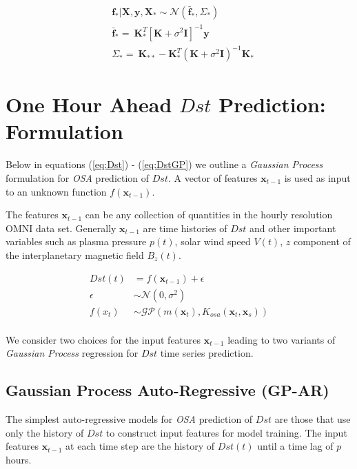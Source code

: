 \documentclass{article}
\begin{document}
\begin{align}
    & \mathbf{f_*}|\mathbf{X},\mathbf{y},\mathbf{X_*} \sim \mathcal{N}(\mathbf{\bar{f}_*}, \Sigma_*)  \label{eq:posterior} \\
    & \mathbf{\bar{f}_*} =  \ \mathbf{K}^T_{*} [\mathbf{K} + \sigma^{2} \mathbf{I}]^{-1} \mathbf{y} \label{eq:posteriormean} \\
    & \Sigma_* = \ \mathbf{K}_{**} - \mathbf{K}^T_{*} \left(\mathbf{K} + \sigma^{2} \mathbf{I}\right)^{-1} \mathbf{K}_{*} \label{eq:posteriorcov}
\end{align}

\section{One Hour Ahead $Dst$ Prediction: Formulation} \label{sec:osa}

Below in equations (\ref{eq:Dst}) - (\ref{eq:DstGP}) we outline a \emph{Gaussian Process} formulation for \emph{OSA} prediction of $Dst$. A vector of features $\mathbf{x}_{t-1}$ is used as input to an unknown function $f(\mathbf{x}_{t-1})$.

The features $\mathbf{x}_{t-1}$ can be any collection of quantities in the hourly resolution OMNI data set. Generally $\mathbf{x}_{t-1}$ are time histories of $Dst$ and other important variables such as plasma pressure $p(t)$, solar wind speed $V(t)$, $z$ component of the interplanetary magnetic field $B_z(t)$.


\begin{align}
    Dst(t) & =  f(\mathbf{x}_{t-1}) + \epsilon \label{eq:Dst} \\
    \epsilon & \sim  \mathcal{N}(0, \sigma^2) \label{eq:GPNoise} \\
    f(x_t) & \sim  \mathcal{GP}(m(\mathbf{x}_t), K_{osa}(\mathbf{x}_t, \mathbf{x}_s)) \label{eq:DstGP} \\
\end{align}

We consider two choices for the input features $\mathbf{x}_{t-1}$ leading to two variants of \emph{Gaussian Process} regression for $Dst$ time series prediction.

\subsection{Gaussian Process Auto-Regressive (GP-AR)} \label{sec:gpar}

The simplest auto-regressive models for \emph{OSA} prediction of $Dst$ are those that use only the history of $Dst$ to construct input features for model training. The input features $\mathbf{x}_{t-1}$ at each time step are the history of $Dst(t)$ until a time lag of $p$ hours.
\end{document}
